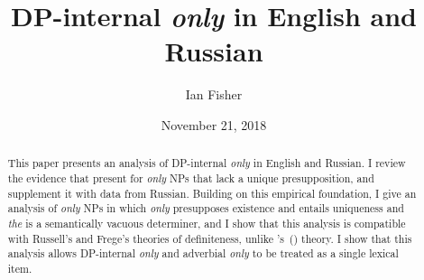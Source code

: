 \documentclass{article}
\title{DP-internal \textit{only} in English and Russian}
\author{Ian Fisher}
\date{November 21, 2018}
\newcommand{\citegen}[1]{\citeauthor{#1}'s~(\citeyear{#1})}
\begin{document}
\maketitle

\begin{abstract}
This paper presents an analysis of DP-internal \textit{only} in English and Russian. I review the evidence that \citet{cb2012b, cb2015} present for \textit{only} NPs that lack a unique presupposition, and supplement it with data from Russian. Building on this empirical foundation, I give an analysis of \textit{only} NPs in which \textit{only} presupposes existence and entails uniqueness and \textit{the} is a semantically vacuous determiner, and I show that this analysis is compatible with Russell's and Frege's theories of definiteness, unlike \citegen{cb2015} theory. I show that this analysis allows DP-internal \textit{only} and adverbial \textit{only} to be treated as a single lexical item.
\end{abstract}












\end{document}
